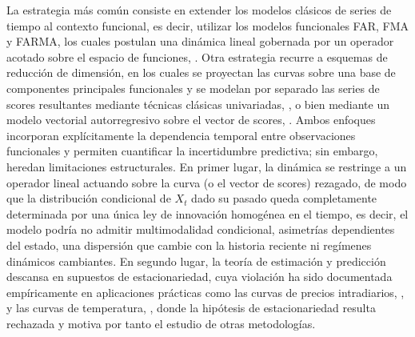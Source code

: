 La estrategia más común consiste en extender los modelos clásicos de series de tiempo al contexto funcional, es decir, utilizar los modelos funcionales FAR, FMA y FARMA, los cuales postulan una dinámica lineal gobernada por un operador acotado sobre el espacio de funciones, \cite{02_02_bosq2000linear}. Otra estrategia recurre a esquemas de reducción de dimensión, en los cuales se proyectan las curvas sobre una base de componentes principales funcionales y se modelan por separado las series de scores resultantes mediante técnicas clásicas univariadas, \cite{03_00_hyndman2007robust,03_00_hyndman2009forecasting}, o bien mediante un modelo vectorial autorregresivo sobre el vector de scores, \cite{02_02_aue2015prediction}. Ambos enfoques incorporan explícitamente la dependencia temporal entre observaciones funcionales y permiten cuantificar la incertidumbre predictiva; sin embargo, heredan limitaciones estructurales. En primer lugar, la dinámica se restringe a un operador lineal actuando sobre la curva (o el vector de scores) rezagado, de modo que la distribución condicional de $X_t$ dado su pasado queda completamente determinada por una única ley de innovación homogénea en el tiempo, es decir, el modelo podría no admitir multimodalidad condicional, asimetrías dependientes del estado, una dispersión que cambie con la historia reciente ni regímenes dinámicos cambiantes. En segundo lugar, la teoría de estimación y predicción descansa en supuestos de estacionariedad, \cite{03_00_hormann2010weakly,02_02_aue2015prediction} cuya violación ha sido documentada empíricamente en aplicaciones prácticas como las curvas de precios intradiarios, \citet{03_00_horvath2014testing}, y las curvas de temperatura, \citet{03_00_aue2018detecting}, donde la hipótesis de estacionariedad resulta rechazada y motiva por tanto el estudio de otras metodologías.\\
 
